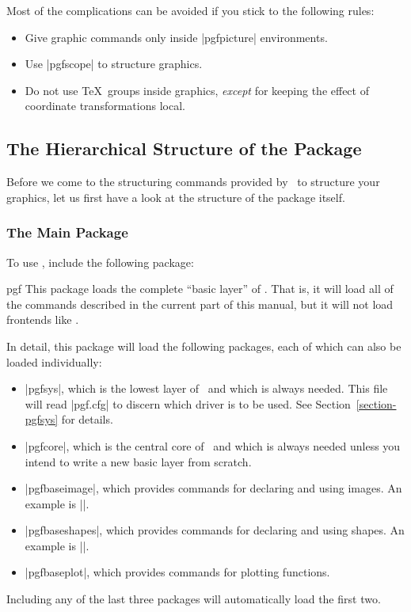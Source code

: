 Most of the complications can be avoided if you stick to the following
rules:

\begin{itemize}
\item
  Give graphic commands only inside |{pgfpicture}| environments.
\item
  Use |{pgfscope}| to structure graphics.
\item
  Do not use \TeX\ groups inside graphics, \emph{except} for keeping
  the effect of coordinate transformations local.
\end{itemize}



\subsection{The Hierarchical Structure of the Package}

Before we come to the structuring commands provided by \pgfname\ to
structure your graphics, let us first have a look at the structure of
the package itself.

\subsubsection{The Main Package}

To use \pgfname, include the following package:

\begin{package}{pgf}
  This package loads the complete ``basic layer'' of \pgfname. That
  is, it will load all of the commands described in the current part
  of this manual, but it will not load frontends like \tikzname.

  In detail, this package will load the following packages, each of
  which can also be loaded individually:
  \begin{itemize}
  \item
    |pgfsys|, which is the lowest layer of \pgfname\ and which is
    always needed. This file will read |pgf.cfg| to discern which
    driver is to be used. See Section~\ref{section-pgfsys} for
    details. 
  \item
    |pgfcore|, which is the central core of \pgfname\ and which is
    always needed unless you intend to write a new basic layer from
    scratch.
  \item
    |pgfbaseimage|, which provides commands for declaring and
    using images. An example is |\pgfuseimage|.
  \item
    |pgfbaseshapes|, which provides commands for declaring and using
    shapes. An example is |\pgfdeclareshape|.
  \item
    |pgfbaseplot|, which provides commands for plotting functions.    
  \end{itemize}

  Including any of the last three packages will automatically load the
  first two.
\end{package}

